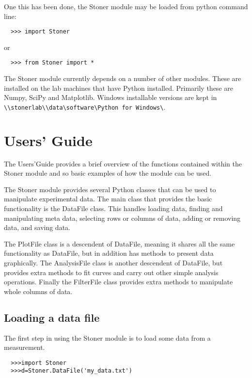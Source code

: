 \documentclass[a4paper,11pt]{scrartcl}
\begin{document}
One this has been done, the Stoner module may be loaded from python command line:

\begin{verbatim}
  >>> import Stoner
\end{verbatim}

or

\begin{verbatim}
  >>> from Stoner import *
\end{verbatim}

The Stoner module currently depends on a number of other modules. These are installed on the lab machines that have Python installed. Primarily these are Numpy, SciPy and Matplotlib. Windows installable versions are kept in \\ \verb#\\stonerlab\\data\software\Python for Windows\#.

\section{Users' Guide}

The Users'Guide provides a brief overview of the functions contained within the Stoner module and so basic examples of how the module can be used.

The Stoner module provides several Python classes that can be used to manipulate experimental data. The main class that provides the basic functionality is the DataFile class. This handles loading data, finding and manipulating meta data, selecting rows or columns of data, adding or removing data, and saving data.

The PlotFile class is a descendent of DataFile, meaning it shares all the same functionality as DataFile, but in addition has methods to present data graphically. The AnalysisFile class is another descendent of DataFile, but provides extra methods to fit curves and carry out other simple analysis operations. Finally the FilterFile class provides extra methods to manipulate whole columns of data.

\subsection{Loading a data file}

The first step in using the Stoner module is to load some data from a measurement.

\begin{verbatim}
  >>>import Stoner
  >>>d=Stoner.DataFile('my_data.txt')
\end{verbatim}
\end{document}
